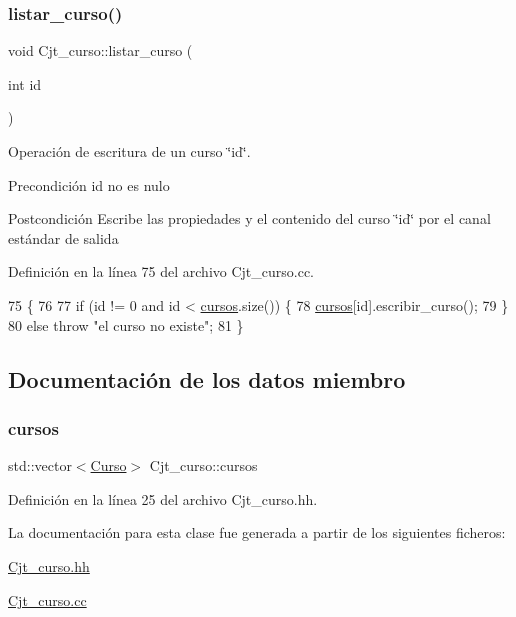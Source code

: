 \subsubsection{\texorpdfstring{listar\+\_\+curso()}{listar\_curso()}}
{\footnotesize\ttfamily void Cjt\+\_\+curso\+::listar\+\_\+curso (\begin{DoxyParamCaption}\item[{int}]{id }\end{DoxyParamCaption})}



Operación de escritura de un curso \char`\"{}id\char`\"{}. 

\begin{DoxyPrecond}{Precondición}
id no es nulo 
\end{DoxyPrecond}
\begin{DoxyPostcond}{Postcondición}
Escribe las propiedades y el contenido del curso \char`\"{}id\char`\"{} por el canal estándar de salida 
\end{DoxyPostcond}


Definición en la línea 75 del archivo Cjt\+\_\+curso.\+cc.


\begin{DoxyCode}
75                                    \{
76 
77     \textcolor{keywordflow}{if} (\textcolor{keywordtype}{id} != 0 and \textcolor{keywordtype}{id} < \mbox{\hyperlink{class_cjt__curso_af8d4def315cf56b9aab3328bf80bb32c}{cursos}}.size()) \{
78       \mbox{\hyperlink{class_cjt__curso_af8d4def315cf56b9aab3328bf80bb32c}{cursos}}[id].escribir\_curso();
79     \}
80     \textcolor{keywordflow}{else} \textcolor{keywordflow}{throw} \textcolor{stringliteral}{"el curso no existe"};
81 \}
\end{DoxyCode}


\subsection{Documentación de los datos miembro}
\mbox{\label{class_cjt__curso_af8d4def315cf56b9aab3328bf80bb32c}} 
\subsubsection{\texorpdfstring{cursos}{cursos}}
{\footnotesize\ttfamily std\+::vector$<$\mbox{\hyperlink{class_curso}{Curso}}$>$ Cjt\+\_\+curso\+::cursos\hspace{0.3cm}{\ttfamily [private]}}



Definición en la línea 25 del archivo Cjt\+\_\+curso.\+hh.



La documentación para esta clase fue generada a partir de los siguientes ficheros\+:\begin{DoxyCompactItemize}
\item 
\mbox{\hyperlink{_cjt__curso_8hh}{Cjt\+\_\+curso.\+hh}}\item 
\mbox{\hyperlink{_cjt__curso_8cc}{Cjt\+\_\+curso.\+cc}}\end{DoxyCompactItemize}
